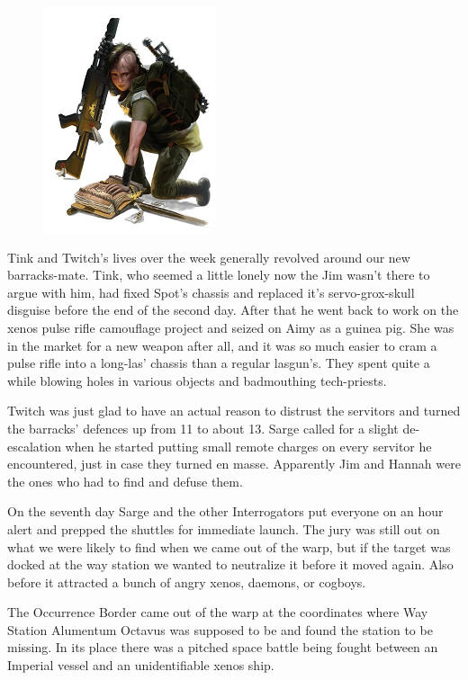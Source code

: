 \begin{figure}
	\begin{center}
		\includegraphics[width=\figwidth]{pics/11/41.png}
	\end{center}
\end{figure}
Tink and Twitch's lives over the week generally revolved around our new barracks-mate. 
Tink, who seemed a little lonely now the Jim wasn't there to argue with him, had fixed Spot's chassis and replaced it's servo-grox-skull disguise before the end of the second day. 
After that he went back to work on the xenos pulse rifle camouflage project and seized on Aimy as a guinea pig. 
She was in the market for a new weapon after all, and it was so much easier to cram a pulse rifle into a long-las' chassis than a regular lasgun's. 
They spent quite a while blowing holes in various objects and badmouthing tech-priests. 


Twitch was just glad to have an actual reason to distrust the servitors and turned the barracks' defences up from 11 to about 13. 
Sarge called for a slight de-escalation when he started putting small remote charges on every servitor he encountered, just in case they turned en masse. 
Apparently Jim and Hannah were the ones who had to find and defuse them.

On the seventh day Sarge and the other Interrogators put everyone on an hour alert and prepped the shuttles for immediate launch. 
The jury was still out on what we were likely to find when we came out of the warp, but if the target was docked at the way station we wanted to neutralize it before it moved again. 
Also before it attracted a bunch of angry xenos, daemons, or cogboys.

The Occurrence Border came out of the warp at the coordinates where Way Station Alumentum Octavus was supposed to be and found the station  to be missing. 
In its place there was a pitched space battle being fought between an Imperial vessel and an unidentifiable xenos ship.


